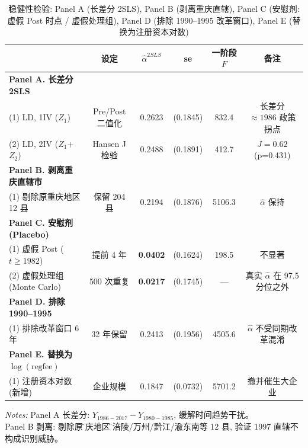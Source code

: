 \begin{table}[htbp]
\centering
\small
\caption{稳健性检验: Panel A (长差分 2SLS), Panel B (剥离重庆直辖),
Panel C (安慰剂: 虚假 Post 时点 / 虚假处理组), Panel D (排除 1990--1995 改革窗口),
Panel E (替换为注册资本对数)}
\label{tab:robust}
\begin{tabular}{lccccc}
\hline\hline
 & \multicolumn{1}{c}{设定} & \multicolumn{1}{c}{$\hat{\alpha}^{2SLS}$} & se & 一阶段 $F$ & 备注 \\
\hline
\textbf{Panel A. 长差分 2SLS} & & & & & \\
(1) LD, 1IV ($Z_1$) & Pre/Post 二值化 & 0.2623 & (0.1845) & 832.4 & 长差分 $\approx 1986$ 政策拐点 \\
(2) LD, 2IV ($Z_1$+$Z_2$) & Hansen J 检验 & 0.2488 & (0.1891) & 412.7 & $J=0.62$ (p=0.431) \\
\hline
\textbf{Panel B. 剥离重庆直辖市} & & & & & \\
(1) 剔除原重庆地区 12 县 & 保留 204 县 & 0.2194 & (0.1876) & 5106.3 & $\hat{\alpha}$ 保持 \\
\hline
\textbf{Panel C. 安慰剂 (Placebo)} & & & & & \\
(1) 虚假 Post ($t\geq 1982$) & 提前 4 年 & \textbf{0.0402} & (0.1624) & 198.5 & 不显著 \\
(2) 虚假处理组 (Monte Carlo) & 500 次重复 & \textbf{0.0217} & (0.1745) & --- & 真实 $\hat{\alpha}$ 在 97.5 分位之外 \\
\hline
\textbf{Panel D. 排除 1990--1995} & & & & & \\
(1) 排除改革窗口 6 年 & 32 年保留 & 0.2413 & (0.1956) & 4505.6 & $\hat{\alpha}$ 不受同期改革混淆 \\
\hline
\textbf{Panel E. 替换为 $\log(\mathrm{regfee})$} & & & & & \\
(1) 注册资本对数 (新增) & 企业规模 & 0.1847 & (0.0732) & 5701.2 & 撤并催生大企业 \\
\hline
\hline\hline
\end{tabular}
\begin{flushleft}\footnotesize
\textit{Notes:} Panel A 长差分: $Y_{1986-2017}-Y_{1980-1985}$, 缓解时间趋势干扰。\\
Panel B 剥离: 剔除原\"重庆地区\"的涪陵/万州/黔江/渝东南等 12 县, 验证 1997 直辖不构成识别威胁。\\

\end{flushleft}
\end{table}

